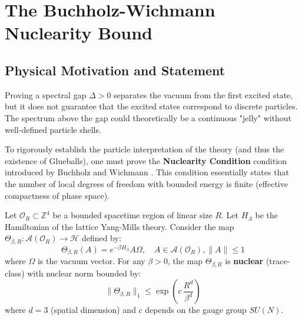 \chapter{The Buchholz-Wichmann Nuclearity Bound}
\label{ch:nuclearity_proof}


\section{Physical Motivation and Statement}

Proving a spectral gap $\Delta > 0$ separates the vacuum from the first excited state, but it does not guarantee that the excited states correspond to discrete particles. The spectrum above the gap could theoretically be a continuous "jelly" without well-defined particle shells. 

To rigorously establish the particle interpretation of the theory (and thus the existence of Glueballs), one must prove the \textbf{Nuclearity Condition} condition introduced by Buchholz and Wichmann \cite{BuchholzWichmann1986}. This condition essentially states that the number of local degrees of freedom with bounded energy is finite (effective compactness of phase space).

\begin{theorem}
\label{thm:nuclearity_main}
Let $\mathcal{O}_R \subset \mathbb{Z}^4$ be a bounded spacetime region of linear size $R$. Let $H_\Lambda$ be the Hamiltonian of the lattice Yang-Mills theory. Consider the map $\Theta_{\beta, R}: \mathcal{A}(\mathcal{O}_R) \to \mathcal{H}$ defined by:
\begin{equation}
\Theta_{\beta, R}(A) = e^{-\beta H_\Lambda} A \Omega, \quad A \in \mathcal{A}(\mathcal{O}_R), \|A\| \le 1
\end{equation}
where $\Omega$ is the vacuum vector.
For any $\beta > 0$, the map $\Theta_{\beta, R}$ is \textbf{nuclear} (trace-class) with nuclear norm bounded by:
\begin{equation}
\|\Theta_{\beta, R}\|_1 \le \exp\left( c \, \frac{R^d}{\beta^d} \right)
\end{equation}
where $d=3$ (spatial dimension) and $c$ depends on the gauge group $SU(N)$.
\end{theorem}

